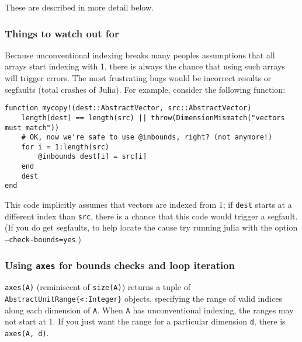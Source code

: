 These are described in more detail below.



\hypertarget{3112549925833933267}{}


\subsubsection{Things to watch out for}



Because unconventional indexing breaks many people{\textquotesingle}s assumptions that all arrays start indexing with 1, there is always the chance that using such arrays will trigger errors. The most frustrating bugs would be incorrect results or segfaults (total crashes of Julia). For example, consider the following function:




\begin{verbatim}
function mycopy!(dest::AbstractVector, src::AbstractVector)
    length(dest) == length(src) || throw(DimensionMismatch("vectors must match"))
    # OK, now we're safe to use @inbounds, right? (not anymore!)
    for i = 1:length(src)
        @inbounds dest[i] = src[i]
    end
    dest
end
\end{verbatim}



This code implicitly assumes that vectors are indexed from 1; if \texttt{dest} starts at a different index than \texttt{src}, there is a chance that this code would trigger a segfault. (If you do get segfaults, to help locate the cause try running julia with the option \texttt{--check-bounds=yes}.)



\hypertarget{1628519832551402952}{}


\subsubsection{Using \texttt{axes} for bounds checks and loop iteration}



\texttt{axes(A)} (reminiscent of \texttt{size(A)}) returns a tuple of \texttt{AbstractUnitRange\{<:Integer\}} objects, specifying the range of valid indices along each dimension of \texttt{A}.  When \texttt{A} has unconventional indexing, the ranges may not start at 1.  If you just want the range for a particular dimension \texttt{d}, there is \texttt{axes(A, d)}.



